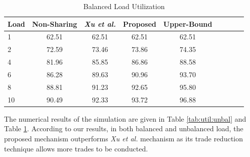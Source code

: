 \begin{table}[htbp]
   \caption{Balanced Load Utilization}
   \label{tab:util:bal}
   \small %
   \centering %
   \begin{tabular}{lcccccccr} %
   \toprule[\heavyrulewidth]\toprule[\heavyrulewidth]
       Load & Non-Sharing    & \textit{Xu et al.} & Proposed    & Upper-Bound \\ \hline
   \midrule
    1  & 62.51  & 62.51 & 62.51  & 62.51\\
    2  & 72.59  & 73.46 & 73.86  & 74.35\\
    4  & 81.96  & 85.85 & 86.86  & 88.58\\
    6  & 86.28  & 89.63 & 90.96  & 93.70\\
    8  & 88.81  & 91.23 & 92.65  & 95.80\\
    10 & 90.49  & 92.33 & 93.72  & 96.88\\
   \bottomrule[\heavyrulewidth]
   \end{tabular}
\end{table}

The numerical results of the simulation are given in Table \ref{tab:util:unbal} and Table \ref{tab:util:bal}. According to our results, in both balanced and unbalanced load, the proposed mechanism outperforms \textit{Xu et al.} mechanism as its trade reduction technique allows more trades to be conducted.




